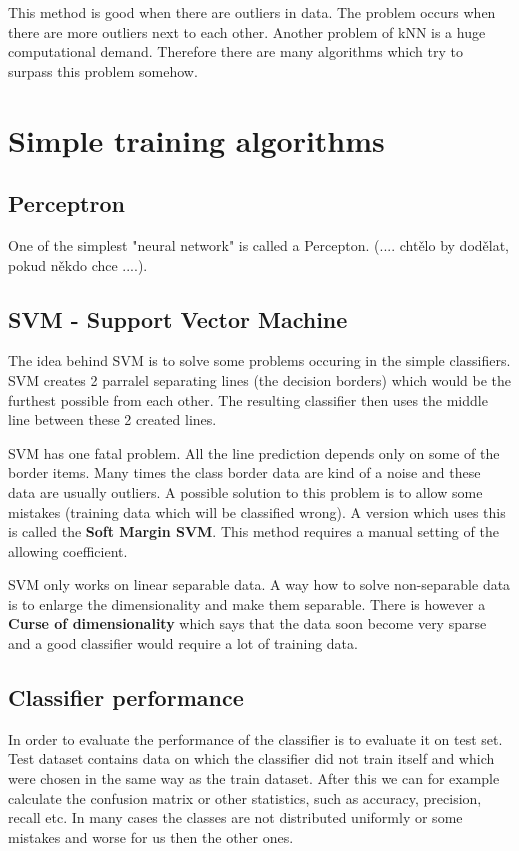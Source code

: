 This method is good when there are outliers in data. The problem occurs when there are more outliers next to each other. Another problem of kNN is a huge computational demand. Therefore there are many algorithms which try to surpass this problem somehow.


\section{Simple training algorithms}

\subsection{Perceptron}
One of the simplest "neural network" is called a Percepton. (.... chtělo by dodělat, pokud někdo chce ....).

\subsection{SVM - Support Vector Machine}
The idea behind SVM is to solve some problems occuring in the simple classifiers. SVM creates 2 parralel separating lines (the decision borders) which would be the furthest possible from each other. The resulting classifier then uses the middle line between these 2 created lines.

SVM has one fatal problem. All the line prediction depends only on some of the border items. Many times the class border data are kind of a noise and these data are usually outliers. A possible solution to this problem is to allow some mistakes (training data which will be classified wrong). A version which uses this is called the \textbf{Soft Margin SVM}. This method requires a manual setting of the allowing coefficient.

SVM only works on linear separable data. A way how to solve non-separable data is to enlarge the dimensionality and make them separable. There is however a \textbf{Curse of dimensionality} which says that the data soon become very sparse and a good classifier would require a lot of training data.

\subsection{Classifier performance}
In order to evaluate the performance of the classifier is to evaluate it on test set. Test dataset contains data on which the classifier did not train itself and which were chosen in the same way as the train dataset. After this we can for example calculate the confusion matrix or other statistics, such as accuracy, precision, recall etc. In many cases the classes are not distributed uniformly or some mistakes and worse for us then the other ones.

